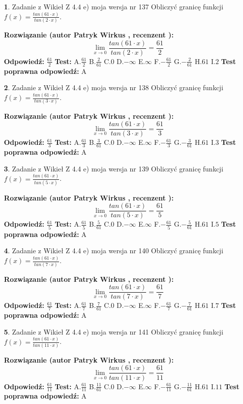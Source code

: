 \documentclass[12pt, a4paper]{article}
\theoremstyle{definition} %
\newtheorem{zad}{}
\newcommand{\zadStart}[1]{\begin{zad}#1\newline}
\newcommand{\zadStop}{\end{zad}}
\newcommand{\rozwStart}[2]{\noindent \textbf{Rozwiązanie (autor #1 , recenzent #2): }\newline}
\newcommand{\rozwStop}{\newline}
\newcommand{\odpStart}{\noindent \textbf{Odpowiedź:}\newline}
\newcommand{\odpStop}{\newline}
\newcommand{\testStart}{\noindent \textbf{Test:}\newline}
\newcommand{\testStop}{\newline}
\newcommand{\kluczStart}{\noindent \textbf{Test poprawna odpowiedź:}\newline}
\newcommand{\kluczStop}{\newline}
\begin{document}
\zadStart{Zadanie z Wikieł Z 4.4 e) moja wersja nr 137}
Obliczyć granicę funkcji $f(x)=\frac{tan(61\cdot x)}{tan(2\cdot x)}$.
\zadStop
\rozwStart{Patryk Wirkus}{}
$$\lim\limits_{x\to 0}\frac{tan(61\cdot x)}{tan(2\cdot x)}=
\frac{61}{2}$$
\rozwStop
\odpStart
$\frac{61}{2}$
\odpStop
\testStart
A.$\frac{61}{2}$
B.$\frac{2}{61}$
C.$0$
D.$-\infty$
E.$\infty$
F.$-\frac{61}{2}$
G.$-\frac{2}{61}$
H.$61$
I.$2$
\testStop
\kluczStart
A
\kluczStop



\zadStart{Zadanie z Wikieł Z 4.4 e) moja wersja nr 138}
Obliczyć granicę funkcji $f(x)=\frac{tan(61\cdot x)}{tan(3\cdot x)}$.
\zadStop
\rozwStart{Patryk Wirkus}{}
$$\lim\limits_{x\to 0}\frac{tan(61\cdot x)}{tan(3\cdot x)}=
\frac{61}{3}$$
\rozwStop
\odpStart
$\frac{61}{3}$
\odpStop
\testStart
A.$\frac{61}{3}$
B.$\frac{3}{61}$
C.$0$
D.$-\infty$
E.$\infty$
F.$-\frac{61}{3}$
G.$-\frac{3}{61}$
H.$61$
I.$3$
\testStop
\kluczStart
A
\kluczStop



\zadStart{Zadanie z Wikieł Z 4.4 e) moja wersja nr 139}
Obliczyć granicę funkcji $f(x)=\frac{tan(61\cdot x)}{tan(5\cdot x)}$.
\zadStop
\rozwStart{Patryk Wirkus}{}
$$\lim\limits_{x\to 0}\frac{tan(61\cdot x)}{tan(5\cdot x)}=
\frac{61}{5}$$
\rozwStop
\odpStart
$\frac{61}{5}$
\odpStop
\testStart
A.$\frac{61}{5}$
B.$\frac{5}{61}$
C.$0$
D.$-\infty$
E.$\infty$
F.$-\frac{61}{5}$
G.$-\frac{5}{61}$
H.$61$
I.$5$
\testStop
\kluczStart
A
\kluczStop



\zadStart{Zadanie z Wikieł Z 4.4 e) moja wersja nr 140}
Obliczyć granicę funkcji $f(x)=\frac{tan(61\cdot x)}{tan(7\cdot x)}$.
\zadStop
\rozwStart{Patryk Wirkus}{}
$$\lim\limits_{x\to 0}\frac{tan(61\cdot x)}{tan(7\cdot x)}=
\frac{61}{7}$$
\rozwStop
\odpStart
$\frac{61}{7}$
\odpStop
\testStart
A.$\frac{61}{7}$
B.$\frac{7}{61}$
C.$0$
D.$-\infty$
E.$\infty$
F.$-\frac{61}{7}$
G.$-\frac{7}{61}$
H.$61$
I.$7$
\testStop
\kluczStart
A
\kluczStop



\zadStart{Zadanie z Wikieł Z 4.4 e) moja wersja nr 141}
Obliczyć granicę funkcji $f(x)=\frac{tan(61\cdot x)}{tan(11\cdot x)}$.
\zadStop
\rozwStart{Patryk Wirkus}{}
$$\lim\limits_{x\to 0}\frac{tan(61\cdot x)}{tan(11\cdot x)}=
\frac{61}{11}$$
\rozwStop
\odpStart
$\frac{61}{11}$
\odpStop
\testStart
A.$\frac{61}{11}$
B.$\frac{11}{61}$
C.$0$
D.$-\infty$
E.$\infty$
F.$-\frac{61}{11}$
G.$-\frac{11}{61}$
H.$61$
I.$11$
\testStop
\kluczStart
A
\kluczStop
\end{document}
